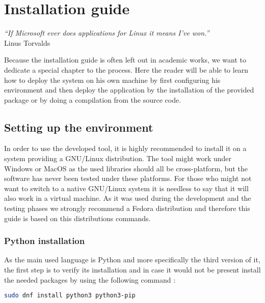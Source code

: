 

\chapter{Installation guide} %
\label{chap:installation}
\begin{flushright}
\textit{``If Microsoft ever does applications for Linux it means I've won.''} \\ Linus Torvalds
\end{flushright}


Because the installation guide is often left out in academic works, we want to dedicate a special chapter to the process. Here the reader will be able to learn how to deploy the system on his own machine by first configuring his environment and then deploy the application by the installation of the provided package or by doing a compilation from the source code.

\section {Setting up the environment}

In order to use the developed tool, it is highly recommended to install it on a system providing a GNU/Linux distribution. The tool might work under Windows or MacOS as the used libraries should all be cross-platform, but the software has never been tested under these platforms. For those who might not want to switch to a native GNU/Linux system it is needless to say that it will also work in a virtual machine. As it was used during the development and the testing phases we strongly recommend a Fedora distribution and therefore this guide is based on this distributions commands.

\subsection{Python installation}

As the main used language is Python and more specifically the third version of it, the first step is to verify its installation and in case it would not be present install the needed packages by using the following command :
\begin{lstlisting}[language=bash]
sudo dnf install python3 python3-pip
\end{lstlisting}

